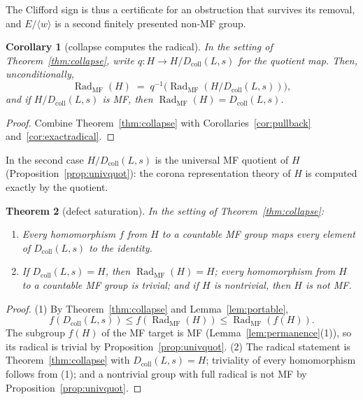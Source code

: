 \documentclass[11pt]{amsart}
\newcommand{\leanverified}[2]{\ignorespaces}
\newtheorem{theorem}{Theorem}[section]
\newtheorem{corollary}[theorem]{Corollary}
\theoremstyle{definition}
\theoremstyle{remark}
\theoremstyle{plain}
\begin{document}
The Clifford sign is thus a certificate for an obstruction that
survives its removal, and $E/\langle w\rangle$ is a second finitely
presented non-MF group.
\begin{corollary}[collapse computes the radical]\label{cor:collapsequot}
In the setting of Theorem~\ref{thm:collapse}, write
$q\colon H\to H/D_{\mathrm{coll}}(L,s)$ for the quotient map.  Then,
unconditionally,
\[
  \operatorname{Rad}_{\mathrm{MF}}(H)
  \;=\;
  q^{-1}\bigl(\operatorname{Rad}_{\mathrm{MF}}
  (H/D_{\mathrm{coll}}(L,s))\bigr),
\]
and if $H/D_{\mathrm{coll}}(L,s)$ is MF, then
$\operatorname{Rad}_{\mathrm{MF}}(H)=D_{\mathrm{coll}}(L,s)$.
\leanverified{Sofic/ManuscriptExactWrappers}{GroupApproximation.ManuscriptExactWrappers.manuscriptCollapseRadicalReduction}
\end{corollary}

\begin{proof}
Combine Theorem~\ref{thm:collapse} with
Corollaries~\ref{cor:pullback} and~\ref{cor:exactradical}.
\end{proof}

In the second case $H/D_{\mathrm{coll}}(L,s)$ is the universal MF
quotient of $H$ (Proposition~\ref{prop:univquot}): the corona
representation theory of $H$ is computed exactly by the quotient.

\begin{theorem}[defect saturation]\label{thm:saturation}
In the setting of Theorem~\ref{thm:collapse}:
\begin{enumerate}
\item Every homomorphism $f$ from $H$ to a countable MF group maps
every element of $D_{\mathrm{coll}}(L,s)$ to the identity.
\item If $D_{\mathrm{coll}}(L,s)=H$, then
$\operatorname{Rad}_{\mathrm{MF}}(H)=H$; every homomorphism from $H$
to a countable MF group is trivial; and if $H$ is nontrivial, then
$H$ is not MF.
\leanverified{Sofic/ManuscriptExactWrappers}{GroupApproximation.ManuscriptExactWrappers.manuscriptDefectSaturation}
\end{enumerate}
\end{theorem}

\begin{proof}
(1)  By Theorem~\ref{thm:collapse} and Lemma~\ref{lem:portable},
\[
 f(D_{\mathrm{coll}}(L,s))\le
 f(\operatorname{Rad}_{\mathrm{MF}}(H))\le
 \operatorname{Rad}_{\mathrm{MF}}(f(H)).
\]
The subgroup $f(H)$ of the MF target is MF
(Lemma~\ref{lem:permanence}(1)), so its radical is trivial by
Proposition~\ref{prop:univquot}.
(2)  The radical statement is Theorem~\ref{thm:collapse} with
$D_{\mathrm{coll}}(L,s)=H$; triviality of every homomorphism follows
from (1); and a nontrivial group with full radical is not MF by
Proposition~\ref{prop:univquot}.
\end{proof}
\end{document}
